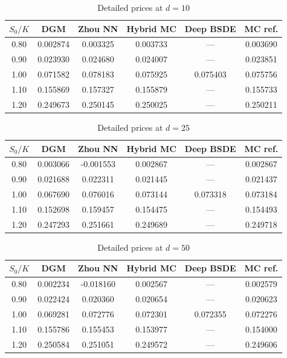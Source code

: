 \documentclass[12pt, a4paper]{article}
\begin{document}
\begin{table}[htpb]
    \centering
    \caption{Detailed prices at $d=10$}
    \label{tab:prices_d10}
    \begin{tabular}{|c|c|c|c|c|c|}
        \hline
        $S_0/K$ & DGM & Zhou NN & Hybrid MC & Deep BSDE & MC ref. \\
        \hline
        0.80 & 0.002874 & 0.003325 & 0.003733 & --- & 0.003690 \\
        0.90 & 0.023930 & 0.024680 & 0.024007 & --- & 0.023851 \\
        1.00 & 0.071582 & 0.078183 & 0.075925 & 0.075403 & 0.075756 \\
        1.10 & 0.155869 & 0.157327 & 0.155879 & --- & 0.155733 \\
        1.20 & 0.249673 & 0.250145 & 0.250025 & --- & 0.250211 \\
        \hline
    \end{tabular}
\end{table}

\begin{table}[htpb]
    \centering
    \caption{Detailed prices at $d=25$}
    \label{tab:prices_d25}
    \begin{tabular}{|c|c|c|c|c|c|}
        \hline
        $S_0/K$ & DGM & Zhou NN & Hybrid MC & Deep BSDE & MC ref. \\
        \hline
        0.80 & 0.003066 & -0.001553 & 0.002867 & --- & 0.002867 \\
        0.90 & 0.021688 & 0.022311 & 0.021445 & --- & 0.021437 \\
        1.00 & 0.067690 & 0.076016 & 0.073144 & 0.073318 & 0.073184 \\
        1.10 & 0.152698 & 0.159457 & 0.154475 & --- & 0.154493 \\
        1.20 & 0.247293 & 0.251661 & 0.249689 & --- & 0.249718 \\
        \hline
    \end{tabular}
\end{table}

\begin{table}[htpb]
    \centering
    \caption{Detailed prices at $d=50$}
    \label{tab:prices_d50}
    \begin{tabular}{|c|c|c|c|c|c|}
        \hline
        $S_0/K$ & DGM & Zhou NN & Hybrid MC & Deep BSDE & MC ref. \\
        \hline
        0.80 & 0.002234 & -0.018160 & 0.002567 & --- & 0.002579 \\
        0.90 & 0.022424 & 0.020360 & 0.020654 & --- & 0.020623 \\
        1.00 & 0.069281 & 0.072776 & 0.072301 & 0.072355 & 0.072276 \\
        1.10 & 0.155786 & 0.155453 & 0.153977 & --- & 0.154000 \\
        1.20 & 0.250584 & 0.251051 & 0.249572 & --- & 0.249606 \\
        \hline
    \end{tabular}
\end{table}
\end{document}
